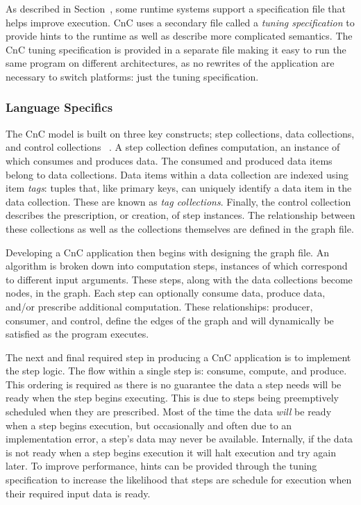 As described in Section~\label{sec:task-based}, some runtime systems support a
specification file that helps improve execution.  CnC uses a secondary file
called a \emph{tuning specification} to provide hints to the runtime as well as
describe more complicated semantics.  The CnC tuning specification is provided
in a separate file making it easy to run the same program on different
architectures, as no rewrites of the application are necessary to switch
platforms: just the tuning specification.

\subsubsection{Language Specifics}
\label{sec:cnc_language}

The CnC model is built on three key constructs; step collections, data
collections, and control collections ~\cite{manual-cnc}. A
step collection defines computation, an instance of which consumes and
produces data. The consumed and produced data items belong to data
collections. Data items within a data collection are indexed using
item \emph{tags}: tuples that, like primary keys, can uniquely identify a
data item in the data collection. These are known as \emph{tag
collections}.  Finally, the control collection describes the prescription, or
creation, of step instances. The relationship between these collections as well
as the collections themselves are defined in the graph file.

Developing a CnC application then begins with designing the graph
file. An algorithm is broken down into computation steps, instances of
which correspond to different input arguments. These steps, along with
the data collections become nodes, in the graph. Each step can
optionally consume data, produce data, and/or prescribe additional
computation. These relationships: producer, consumer, and control,
define the edges of the graph and will dynamically be satisfied as the
program executes.

The next and final required step in producing a CnC application is to
implement the step logic. The flow within a single step is: consume,
compute, and produce. This ordering is required as there is no
guarantee the data a step needs will be ready when the step begins
executing. This is due to steps being preemptively scheduled when they
are prescribed. Most of the time the data \emph{will} be ready when a
step begins execution, but occasionally and often due to an
implementation error, a step's data may never be available.
Internally, if the data is not ready when a step begins execution
it will halt execution and try again later. To improve performance,
hints can be provided through the tuning specification to increase the
likelihood that steps are schedule for execution when their required
input data is ready.


